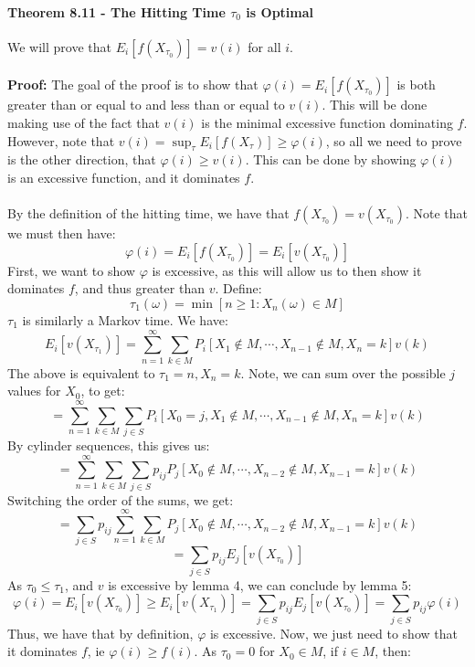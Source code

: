 \documentclass[12pt,a4paper]{article}
\newcommand{\1}[1]{\mathbbm{1}\left\{ #1 \right\}}
\begin{document}
\paragraph{Theorem 8.11 - The Hitting Time $\tau_0$ is Optimal} We will prove that $E_i\left[f(X_{\tau_0})\right] = v(i)$ for all $i$.
\\\\
\textbf{Proof:} The goal of the proof is to show that $\varphi(i) = E_i\left[f(X_{\tau_0})\right]$ is both greater than or equal to and less than or equal to $v(i)$. This will be done making use of the fact that $v(i)$ is the minimal excessive function dominating $f$. However, note that $v(i) = \sup_\tau E_i\left[f(X_\tau)\right] \geq \varphi(i)$, so all we need to prove is the other direction, that $\varphi(i) \geq v(i)$. This can be done by showing $\varphi(i)$ is an excessive function, and it dominates $f$.
\\\\
By the definition of the hitting time, we have that $f(X_{\tau_0}) = v(X_{\tau_0})$. Note that we must then have:
$$
	\varphi(i) = E_i\left[f(X_{\tau_0})\right] = E_i\left[v(X_{\tau_0})\right]
$$
First, we want to show $\varphi$ is excessive, as this will allow us to then show it dominates $f$, and thus greater than $v$. Define:
$$
	\tau_1(\omega) = \min\left[n \geq 1 : X_n(\omega) \in M\right]
$$
$\tau_1$ is similarly a Markov time. We have:
$$
	E_i\left[v(X_{\tau_1})\right] =
	\sum_{n=1}^\infty \sum_{k \in M} P_i\left[X_1 \not\in M, \cdots, X_{n-1} \not\in M, X_n = k\right] v(k)
$$
The above is equivalent to $\tau_1 = n, X_n = k$. Note, we can sum over the possible $j$ values for $X_0$, to get:
$$
	= \sum_{n=1}^\infty \sum_{k \in M} \sum_{j \in S} P_i\left[X_0 = j, X_1 \not\in M, \cdots, X_{n-1} \not\in M, X_n = k\right] v(k)
$$
By cylinder sequences, this gives us:
$$
	= \sum_{n=1}^\infty \sum_{k \in M} \sum_{j \in S} p_{ij}P_j\left[X_0 \not\in M, \cdots, X_{n-2} \not\in M, X_{n-1} = k\right] v(k)
$$
Switching the order of the sums, we get:
$$
	= \sum_{j \in S} p_{ij} \sum_{n=1}^\infty \sum_{k \in M} P_j\left[X_0 \not\in M, \cdots, X_{n-2} \not\in M, X_{n-1} = k\right] v(k)
$$
$$
	= \sum_{j \in S} p_{ij} E_j\left[v(X_{\tau_0})\right]
$$
As $\tau_0 \leq \tau_1$, and $v$ is excessive by lemma 4, we can conclude by lemma 5:
$$
	\varphi(i) = E_i\left[v(X_{\tau_0})\right] \geq E_i\left[v(X_{\tau_1})\right] =
	\sum_{j \in S} p_{ij} E_j\left[v(X_{\tau_0})\right] =
	\sum_{j \in S} p_{ij} \varphi(i)
$$
Thus, we have that by definition, $\varphi$ is excessive. Now, we just need to show that it dominates $f$, ie $\varphi(i) \geq f(i)$. As $\tau_0 = 0$ for $X_0 \in M$, if $i \in M$, then:
\end{document}
